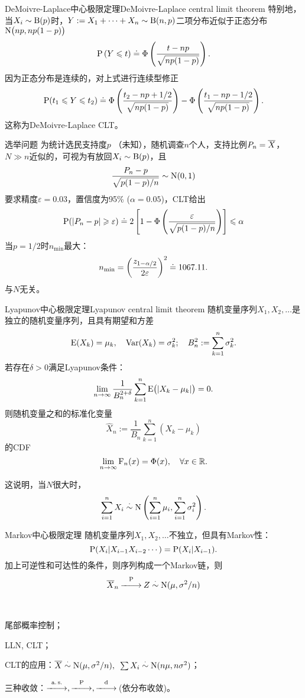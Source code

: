 \begin{example}{DeMoivre-Laplace中心极限定理}{DeMoivre-Laplace central limit theorem}
	特别地，当$X_i\sim\Bern(p)$时，$Y:=X_1+\cdots+X_n\sim\Bern(n,p)$二项分布近似于正态分布$\Norm\bigkh{np,np(1-p)}$
	\[
		\P\kh{Y\leqslant t}\doteq\Phi\kh{\frac{t-np}{\sqrt{np(1-p)}}}.
	\]
	因为正态分布是连续的，对上式进行连续型修正
	\[
		\P(t_1\leqslant Y\leqslant t_2)\doteq\Phi\kh{\frac{t_2-np+1/2}{\sqrt{np(1-p)}}}-\Phi\kh{\frac{t_1-np-1/2}{\sqrt{np(1-p)}}}.
	\]
	这称为DeMoivre-Laplace CLT。
\end{example}
\begin{example}{选举问题}{}
	为统计选民支持度$p$ （未知），随机调查$n$个人，支持比例$P_n=\avg X$，$N\gg n$近似的，可视为有放回$X_i\sim\Bern(p)$，且
	\[
		\frac{P_n-p}{\sqrt{p(1-p)/n}}\sim\Norm(0,1)
	\]
	要求精度$\varepsilon=0.03$，置信度为95\% ($\alpha=0.05$)，CLT给出
	\[
		\P(|P_n-p|\geqslant\varepsilon)\doteq 2\fkh{1-\Phi\kh{\frac\varepsilon{\sqrt{p(1-p)/n}}}}\leqslant\alpha
	\]
	当$p=1/2$时$n_{\mathrm{min}}$最大：
	\[
		n_{\mathrm{min}}=\biggkh{\frac{z_{1-\alpha/2}}{2\varepsilon}}^2\doteq 1067.11.
	\]%
	与$N$无关。
\end{example}
\begin{theorem}{Lyapunov中心极限定理}{Lyapunov central limit theorem}
	随机变量序列$X_1,X_2,\ldots$是独立的随机变量序列，且具有期望和方差
	\[
		\E(X_k)=\mu_k,\quad\Var(X_k)=\sigma_k^2;\quad B_n^2:=\sum_{k=1}^n\sigma_k^2.
	\]
	若存在$\delta>0$满足Lyapunov条件：
	\[
		\lim_{n\to\infty}\frac1{B_n^{2+\delta}}\sum_{k=1}^n\E\bigkh{|X_k-\mu_k|}=0.
	\]
	则随机变量之和的标准化变量
	\[
		\hat X_n:=\frac1{B_n}\sum_{k=1}^n(X_k-\mu_k)
	\]
	的CDF
	\[
		\lim_{n\to\infty}\CDF_n(x)=\Phi(x),\quad\forall x\in\RR.
	\]
\end{theorem}
这说明，当$N$很大时，
\begin{align}
	\sum_{i=1}^nX_i\dotsim\Norm\kh{\sum_{i=1}^n\mu_i,\sum_{i=1}^n\sigma^2_i}.
\end{align}

\begin{theorem}{Markov中心极限定理}{}
	随机变量序列$X_1,X_2,\ldots$不独立，但具有Markov性：
	\[
		\P(X_i|X_{i-1}X_{i-2}\cdots)=\P(X_i|X_{i-1}).
	\]
	加上可逆性和可达性的条件，则序列构成一个Markov链，则
	\begin{align}
		\avg X_n\pto Z\dotsim\Norm(\mu,\sigma^2/n)
	\end{align}
\end{theorem}

\begin{remark}~
	\begin{compactenum}
		\item 尾部概率控制；
		\item LLN, CLT；
		\item CLT的应用：$\avg X\dotsim\Norm(\mu,\sigma^2/n),\enspace\sum X_i\dotsim\Norm(n\mu,n\sigma^2)$；
		\item 三种收敛：$\asto,\pto,\dto$\,(依分布收敛)。
	\end{compactenum}

\end{remark}